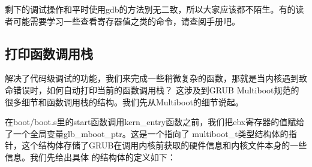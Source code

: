 \par 剩下的调试操作和平时使用gdb的方法别无二致，所以大家应该都不陌生。有的读者可能需要学习一些查看寄存器值之类的命令，请查阅手册吧。

\subsection{打印函数调用栈}

\par 解决了代码级调试的功能，我们来完成一些稍微复杂的函数，那就是当内核遇到致命错误时，如何自动打印当前的函数调用栈？\allowbreak
这涉及到GRUB Multiboot规范的很多细节和函数调用栈的结构。我们先从Multiboot的细节说起。

\par 在boot/boot.s里的start函数调用kern\_entry函数之前，我们把ebx寄存器的值赋给了一个全局变量glb\_mboot\_ptr。这是一个指向了\allowbreak
multiboot\_t类型结构体的指针，这个结构体存储了GRUB在调用内核前获取的硬件信息和内核文件本身的一些信息。我们先给出具体\allowbreak
的结构体的定义如下：

